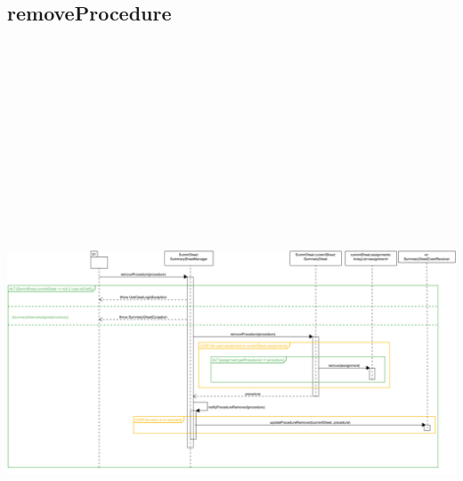 \subsection{removeProcedure}
\centering\includegraphics[max width=\textwidth, max height=190mm]{../resources/img/GCC/DSD/op2a.png}


